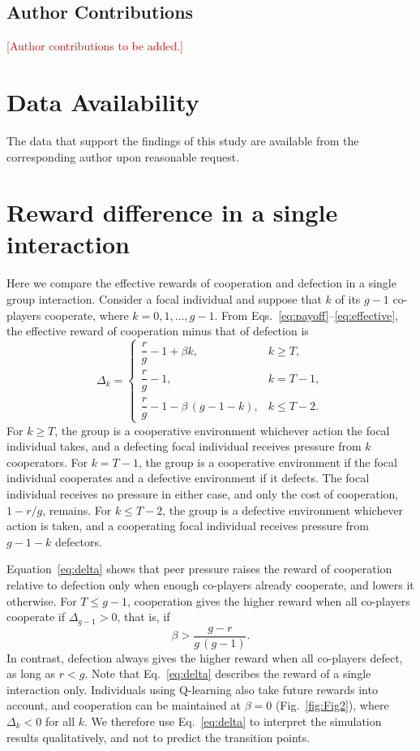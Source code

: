 \documentclass[%
  aip,cha,
  amsmath,amssymb,
  reprint,
  floatfix,
  article-title,
]{revtex4-2}
\newcommand{\AQ}[1]{\textcolor{red}{[#1]}}
\begin{document}
\subsection*{Author Contributions}
\AQ{Author contributions to be added.}

\section*{Data Availability}
The data that support the findings of this study are available from the corresponding author upon reasonable request.

\appendix*
\section{Reward difference in a single interaction}\label{sec:appendix}

Here we compare the effective rewards of cooperation and defection in a single group interaction. Consider a focal individual and suppose that $k$ of its $g-1$ co-players cooperate, where $k=0,1,\dots,g-1$. From Eqs.~\eqref{eq:payoff}--\eqref{eq:effective}, the effective reward of cooperation minus that of defection is
\begin{equation}
\Delta_k=
\begin{cases}
\dfrac{r}{g}-1+\beta k, & k\geq T,\\[1.5ex]
\dfrac{r}{g}-1, & k=T-1,\\[1.5ex]
\dfrac{r}{g}-1-\beta\,(g-1-k), & k\leq T-2.
\end{cases}
\label{eq:delta}
\end{equation}
For $k\geq T$, the group is a cooperative environment whichever action the focal individual takes, and a defecting focal individual receives pressure from $k$ cooperators. For $k=T-1$, the group is a cooperative environment if the focal individual cooperates and a defective environment if it defects. The focal individual receives no pressure in either case, and only the cost of cooperation, $1-r/g$, remains. For $k\leq T-2$, the group is a defective environment whichever action is taken, and a cooperating focal individual receives pressure from $g-1-k$ defectors.

Equation~\eqref{eq:delta} shows that peer pressure raises the reward of cooperation relative to defection only when enough co-players already cooperate, and lowers it otherwise. For $T\leq g-1$, cooperation gives the higher reward when all co-players cooperate if $\Delta_{g-1}>0$, that is, if
\begin{equation}
\beta>\frac{g-r}{g\,(g-1)}.
\label{eq:betastar}
\end{equation}
In contrast, defection always gives the higher reward when all co-players defect, as long as $r<g$. Note that Eq.~\eqref{eq:delta} describes the reward of a single interaction only. Individuals using Q-learning also take future rewards into account, and cooperation can be maintained at $\beta=0$ (Fig.~\ref{fig:Fig2}), where $\Delta_k<0$ for all $k$. We therefore use Eq.~\eqref{eq:delta} to interpret the simulation results qualitatively, and not to predict the transition points.
\end{document}
